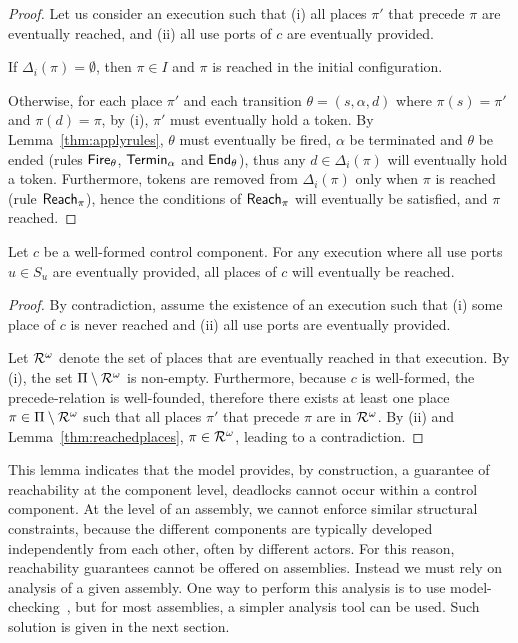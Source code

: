 {  \begin{proof}
    Let us consider an execution such that (i) all places $\pi'$ that
    precede $\pi$ are eventually reached, and (ii) all use ports of
    $c$ are eventually provided.

    If $\Delta_i(\pi) = \emptyset$, then $\pi \in I$ and $\pi$ is
    reached in the initial configuration.
    
    Otherwise, for each place $\pi'$ and each transition $\theta = (s,
    \alpha, d)$ where $\pi(s) = \pi'$ and $\pi(d) = \pi$, by (i),
    $\pi'$ must eventually hold a token. By
    Lemma~\ref{thm:applyrules}, $\theta$ must eventually be fired,
    $\alpha$ be terminated and $\theta$ be ended (rules $\mathsf{Fire}_\theta$,
    $\mathsf{Termin}_\alpha$ and $\mathsf{End}_\theta$), thus any $d \in \Delta_i(\pi)$
    will eventually hold a token. Furthermore, tokens are removed from
    $\Delta_i(\pi)$ only when $\pi$ is reached (rule $\mathsf{Reach}_\pi$),
    hence the conditions of $\mathsf{Reach}_\pi$ will eventually be
    satisfied, and $\pi$ reached.
  \end{proof}
  
  \begin{lemma}
    Let $c$ be a well-formed control component. For any execution where all
    use ports $u \in S_u$ are eventually provided, all places of $c$
    will eventually be reached.
  \end{lemma}

  \begin{proof}
    By contradiction, assume the existence of an execution such that
    (i) some place of $c$ is never reached and (ii) all use ports are
    eventually provided.

    Let $\mathcal{R}^\omega$ denote the set of places that are eventually
    reached in that execution. By (i), the set $\Pi \setminus
    \mathcal{R}^\omega$ is non-empty. Furthermore, because $c$ is
    well-formed, the precede-relation is well-founded, therefore there
    exists at least one place $\pi \in \Pi \setminus \mathcal{R}^\omega$
    such that all places $\pi'$ that precede $\pi$ are in
    $\mathcal{R}^\omega$. By (ii) and Lemma~\ref{thm:reachedplaces}, $\pi
    \in \mathcal{R}^\omega$, leading to a contradiction.
  \end{proof}

  This lemma indicates that the \mad model provides, by construction, a guarantee of reachability at the component level, \ie deadlocks cannot occur within a control component. At the level of an assembly, we cannot enforce similar structural constraints, because the different components are typically developed independently from each other, often by different actors. For this reason, reachability guarantees cannot be offered on assemblies. Instead we must rely on analysis of a given assembly. One way to perform this analysis is to use model-checking~\cite{coullon:hal-02323641}, but for most assemblies, a simpler analysis tool can be used. Such solution is given in the next section. 

}
